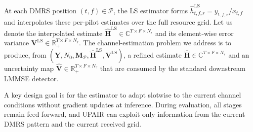 \documentclass[conference,letterpaper]{IEEEtran}
\begin{document}
	
	
	At each DMRS position $(t,f)\in\mathcal{P}$, the LS estimator forms $\widehat{h}_{t,f,r}^{\mathrm{LS}}=y_{t,f,r}/x_{t,f}$ and interpolates these per-pilot estimates over the full resource grid. Let us denote the interpolated estimate $\widehat{\mathbf{H}}^{\mathrm{LS}}\in\mathbb{C}^{T\times F\times N_r}$ and its element-wise error variance $\mathbf{V}^{\mathrm{LS}}\in\mathbb{R}_{+}^{T\times F\times N_r}$. The channel-estimation problem we address is to produce, from $(\mathbf{Y}, N_0, \mathbf{M}_{\mathcal{P}}, \widehat{\mathbf{H}}^{\mathrm{LS}}, \mathbf{V}^{\mathrm{LS}})$, a refined estimate $\widehat{\mathbf{H}}\in\mathbb{C}^{T\times F\times N_r}$ and an uncertainty map $\widehat{\mathbf{V}}\in\mathbb{R}_{+}^{T\times F\times N_r}$ that are consumed by the standard downstream LMMSE detector.
	
	
	A key design goal is for the estimator to adapt slotwise to the current channel conditions without gradient updates at inference. During evaluation, all stages remain feed-forward, and UPAIR can exploit only information from the current DMRS pattern and the current received grid.
	
\end{document}
